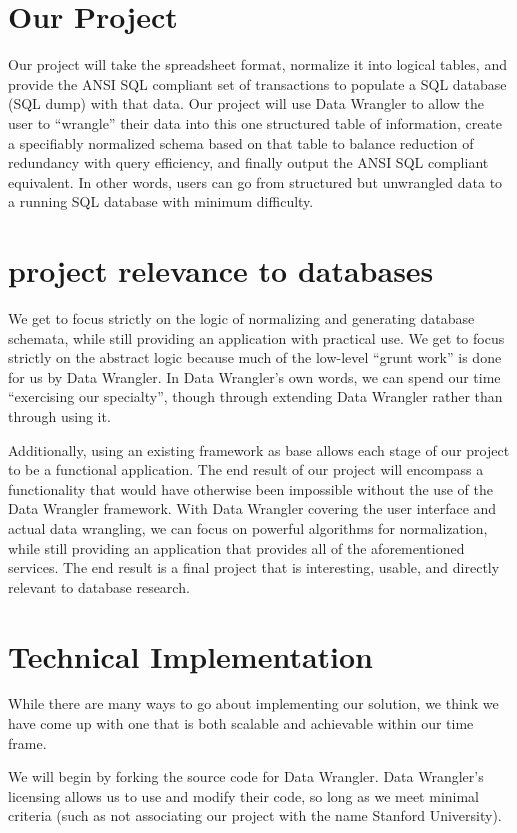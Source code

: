 \documentclass{../sty/acm_proc_article-sp}
\begin{document}
\section{Our Project}
Our project will take the spreadsheet format, normalize it into logical tables, and provide the ANSI SQL compliant set of transactions to populate a SQL database (SQL dump) with that data. Our project will use Data Wrangler to allow the user to ``wrangle'' their data into this one structured table of information, create a specifiably normalized schema based on that table to balance reduction of redundancy with query efficiency, and finally output the ANSI SQL compliant equivalent. In other words, users can go from structured but unwrangled data to a running SQL database with minimum difficulty.

\section{project relevance to databases}
We get to focus strictly on the logic of normalizing and generating database schemata, while still providing an application with practical use.
We get to focus strictly on the abstract logic because much of the low-level ``grunt work'' is done for us by Data Wrangler. In Data Wrangler's own words, we can spend our time ``exercising our specialty'', though through extending Data Wrangler rather than through using it.


Additionally, using an existing framework as base allows each stage of our project to be a functional application. The end result of our project will encompass a functionality that would have otherwise been impossible without the use of the Data Wrangler framework. With Data Wrangler covering the user interface and actual data wrangling, we can focus on powerful algorithms for normalization, while still providing an application that provides all of the aforementioned services. The end result is a final project that is interesting, usable, and directly relevant to database research.

\section{Technical Implementation}
While there are many ways to go about implementing our solution, we think we have come up with one that is both scalable and achievable within our time frame.

We will begin by forking the source code for Data Wrangler. Data Wrangler's licensing allows us to use and modify their code, so long as we meet minimal criteria (such as not associating our project with the name Stanford University).
\end{document}
